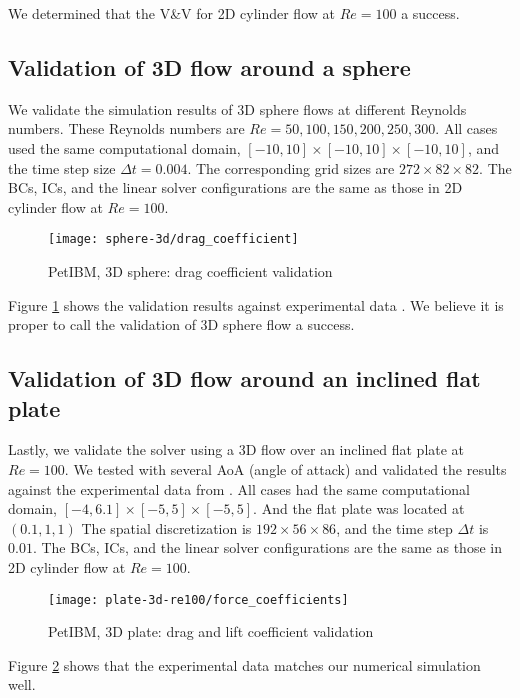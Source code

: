 We determined that the V\&V for 2D cylinder flow at $Re=100$ a success.

\subsection*{Validation of 3D flow around a sphere}

We validate the simulation results of 3D sphere flows at different Reynolds numbers.
These Reynolds numbers are $Re=50, 100, 150, 200, 250, 300$.
All cases used the same computational domain, $[-10, 10] \times [-10, 10] \times [-10, 10]$, and the time step size $\Delta t=0.004$.
The corresponding grid sizes are $272 \times 82 \times 82$.
The BCs, ICs, and the linear solver configurations are the same as those in 2D cylinder flow at $Re=100$.

\begin{figure}[H]
    \texttt{[image: sphere-3d/drag\_coefficient]}
    \caption[PetIBM, 3D sphere: drag coefficient validation]{
        PetIBM, 3D sphere: drag coefficient validation \cite{clift_bubbles_2013,roos_experimental_1971}
    }
    \label{fig:petibm-sphere3d-drag-val}
\end{figure}

Figure \ref{fig:petibm-sphere3d-drag-val} shows the validation results against experimental data \cite{clift_bubbles_2013,roos_experimental_1971}.
We believe it is proper to call the validation of 3D sphere flow a success.

\subsection*{Validation of 3D flow around an inclined flat plate}

Lastly, we validate the solver using a 3D flow over an inclined flat plate at $Re=100$.
We tested with several AoA (angle of attack) and validated the results against the experimental data from \cite{taira_unsteadiness_2007}.
All cases had the same computational domain, $[-4, 6.1] \times [-5, 5] \times [-5, 5]$.
And the flat plate was located at $(0.1, 1, 1)$
The spatial discretization is $192 \times 56 \times 86$, and the time step $\Delta t$ is $0.01$.
The BCs, ICs, and the linear solver configurations are the same as those in 2D cylinder flow at $Re=100$.

\begin{figure}[H]
    \texttt{[image: plate-3d-re100/force\_coefficients]}
    \caption{PetIBM, 3D plate: drag and lift coefficient validation}
    \label{fig:petibm-plate3d-drag-lift-val}
\end{figure}

Figure \ref{fig:petibm-plate3d-drag-lift-val} shows that the experimental data matches our numerical simulation well.

